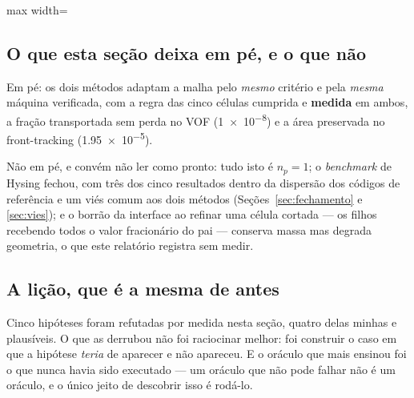 \begin{adjustbox}{max width=\linewidth}
\end{adjustbox}

\subsection{O que esta se\c{c}\~ao deixa em p\'e, e o que n\~ao}

Em p\'e: os dois m\'etodos adaptam a malha pelo \emph{mesmo} crit\'erio e pela
\emph{mesma} m\'aquina verificada, com a regra das cinco c\'elulas cumprida e
\textbf{medida} em ambos, a fra\c{c}\~ao transportada sem perda no VOF
(\num{1e-8}) e a \'area preservada no front-tracking (\num{1.95e-5}).

N\~ao em p\'e, e convém n\~ao ler como pronto: tudo isto \'e $n_p=1$; o
\emph{benchmark} de Hysing fechou, com tr\^es dos cinco resultados dentro da
dispers\~ao dos c\'odigos de refer\^encia e um vi\'es comum aos dois m\'etodos
(Se\c{c}\~oes~\ref{sec:fechamento} e \ref{sec:vies}); e o borr\~ao da interface ao
refinar uma c\'elula cortada --- os filhos recebendo todos o valor fracion\'ario
do pai --- conserva massa mas degrada geometria, o que este relat\'orio
registra sem medir.

\subsection{A li\c{c}\~ao, que \'e a mesma de antes}

Cinco hip\'oteses foram refutadas por medida nesta se\c{c}\~ao, quatro delas
minhas e plaus\'iveis. O que as derrubou n\~ao foi raciocinar melhor: foi
construir o caso em que a hip\'otese \emph{teria} de aparecer e n\~ao apareceu.
E o or\'aculo que mais ensinou foi o que nunca havia sido executado --- um
or\'aculo que n\~ao pode falhar n\~ao \'e um or\'aculo, e o \'unico jeito de
descobrir isso \'e rod\'a-lo.
